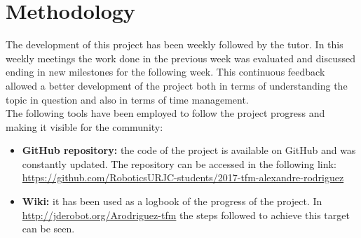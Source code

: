 \section{Methodology} \label{Methodology}
The development of this project has been weekly followed by the tutor. In this weekly meetings the work done in the previous week was evaluated and discussed ending in new milestones for the following week. This continuous feedback allowed a better development of the project both in terms of understanding the topic in question and also in terms of time management.\\
The following tools have been employed to follow the project progress and making it visible for the community:
\begin{itemize}
    \item \textbf{GitHub repository:} the code of the project is available on GitHub and was constantly updated. The repository can be accessed in the following link: \url{https://github.com/RoboticsURJC-students/2017-tfm-alexandre-rodriguez}
    \item \textbf{Wiki:} it has been used as a logbook of the progress of the project. In \url{http://jderobot.org/Arodriguez-tfm} the steps followed to achieve this target can be seen.
\end{itemize}
